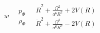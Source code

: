 \begin{equation}
w =\frac{p_\Phi}{\rho_\Phi}=
\frac{\dot{R}^{2}+\frac{\Omega^{2}}{a^{6}R^{2}}+2V(R)}{\dot{R}^{2}+
\frac{\Omega^{2}}{a^{6}R^{2}}-2V(R)}
\end{equation}

